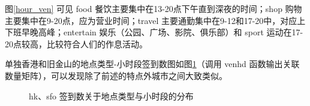 \documentclass[UTF8]{ctexart}
\begin{document}
		图\ref{hour_ven} 可见 food 餐饮主要集中在13-20点下午直到深夜的时间；shop 购物主要集中在9-20点，应为营业时间；travel 主要通勤集中在9-12和17-20中，对应上下班早晚高峰；entertain 娱乐（公园、广场、影院、俱乐部）和 sport 运动在17-20点较高，比较符合人们的作息活动。
		
		单独香港和旧金山的地点类型-小时段签到数图如图\ref{hour_ven_hs}（调用 venhd 函数输出关联数量矩阵），可以发现除了前述的特点外城市之间大致类似。
		\begin{figure}[H]
			\centering
			\caption{hk、sfo 签到数关于地点类型与小时段的分布}
			\label{hour_ven_hs}
		\end{figure}
		
\end{document}
